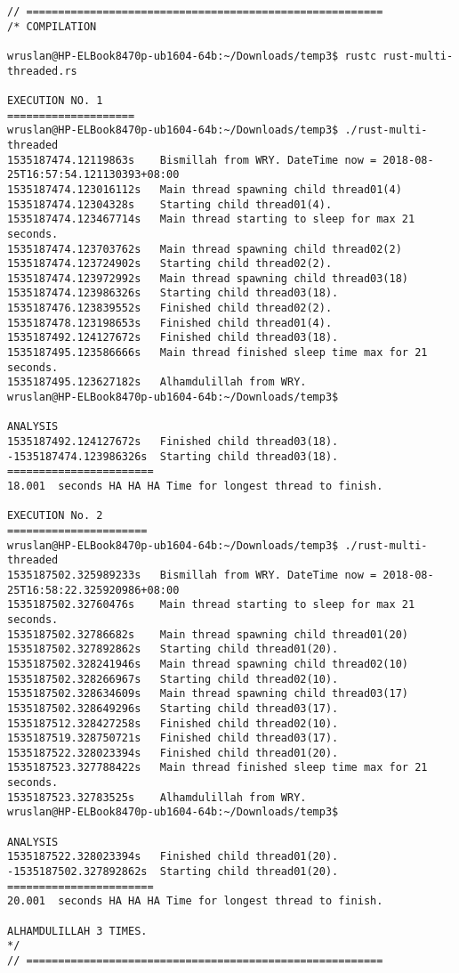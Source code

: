 \begin{lstlisting}[caption={App4-Rust Parallel Multithreading Codes}, label=App4-Rust Parallel Multithreading Codes]
// ========================================================
/* COMPILATION 

wruslan@HP-ELBook8470p-ub1604-64b:~/Downloads/temp3$ rustc rust-multi-threaded.rs 

EXECUTION NO. 1
====================
wruslan@HP-ELBook8470p-ub1604-64b:~/Downloads/temp3$ ./rust-multi-threaded 
1535187474.12119863s 	Bismillah from WRY. DateTime now = 2018-08-25T16:57:54.121130393+08:00 
1535187474.123016112s 	Main thread spawning child thread01(4)
1535187474.12304328s 	Starting child thread01(4).
1535187474.123467714s 	Main thread starting to sleep for max 21 seconds.
1535187474.123703762s 	Main thread spawning child thread02(2)
1535187474.123724902s 	Starting child thread02(2).
1535187474.123972992s 	Main thread spawning child thread03(18)
1535187474.123986326s 	Starting child thread03(18).
1535187476.123839552s 	Finished child thread02(2).
1535187478.123198653s 	Finished child thread01(4).
1535187492.124127672s 	Finished child thread03(18).
1535187495.123586666s 	Main thread finished sleep time max for 21 seconds.
1535187495.123627182s 	Alhamdulillah from WRY.
wruslan@HP-ELBook8470p-ub1604-64b:~/Downloads/temp3$ 

ANALYSIS
1535187492.124127672s 	Finished child thread03(18).
-1535187474.123986326s 	Starting child thread03(18).
=======================
18.001  seconds HA HA HA Time for longest thread to finish.

EXECUTION No. 2
======================
wruslan@HP-ELBook8470p-ub1604-64b:~/Downloads/temp3$ ./rust-multi-threaded 
1535187502.325989233s 	Bismillah from WRY. DateTime now = 2018-08-25T16:58:22.325920986+08:00 
1535187502.32760476s 	Main thread starting to sleep for max 21 seconds.
1535187502.32786682s 	Main thread spawning child thread01(20)
1535187502.327892862s 	Starting child thread01(20).
1535187502.328241946s 	Main thread spawning child thread02(10)
1535187502.328266967s 	Starting child thread02(10).
1535187502.328634609s 	Main thread spawning child thread03(17)
1535187502.328649296s 	Starting child thread03(17).
1535187512.328427258s 	Finished child thread02(10).
1535187519.328750721s 	Finished child thread03(17).
1535187522.328023394s 	Finished child thread01(20).
1535187523.327788422s 	Main thread finished sleep time max for 21 seconds.
1535187523.32783525s 	Alhamdulillah from WRY.
wruslan@HP-ELBook8470p-ub1604-64b:~/Downloads/temp3$ 

ANALYSIS
1535187522.328023394s 	Finished child thread01(20).
-1535187502.327892862s 	Starting child thread01(20).
=======================
20.001  seconds HA HA HA Time for longest thread to finish. 

ALHAMDULILLAH 3 TIMES.
*/
// ========================================================
\end{lstlisting}

